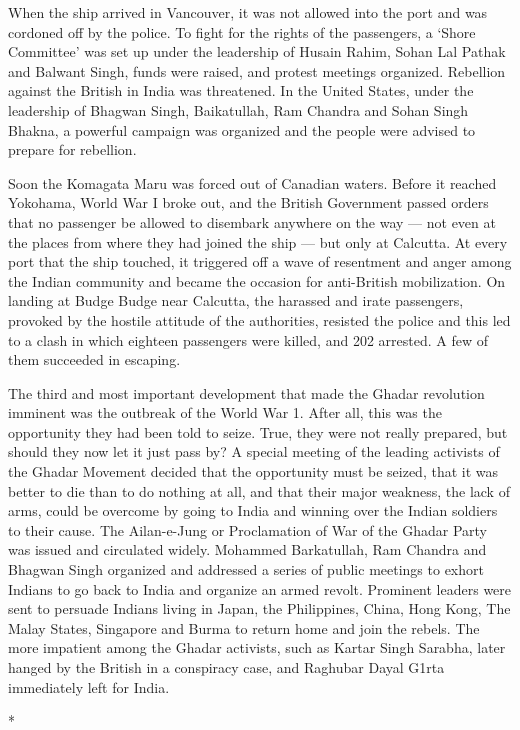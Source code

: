 When the ship arrived in Vancouver, it was not allowed into the port and was cordoned off by the police. To fight for the rights of the passengers, a `Shore Committee' was set up under the leadership of Husain Rahim, Sohan Lal Pathak and Balwant Singh, funds were raised, and protest meetings organized. Rebellion against the British in India was threatened. In the United States, under the leadership of Bhagwan Singh, Baikatullah, Ram Chandra and Sohan Singh Bhakna, a powerful campaign was organized and the people were advised to prepare for rebellion.

Soon the Komagata Maru was forced out of Canadian waters. Before it reached Yokohama, World War I broke out, and the British Government passed orders that no passenger be allowed to disembark anywhere on the way — not even at the places from where they had joined the ship — but only at Calcutta. At every port that the ship touched, it triggered off a wave of resentment and anger among the Indian community and became the occasion for anti-British mobilization. On landing at Budge Budge near Calcutta, the harassed and irate passengers, provoked by the hostile attitude of the authorities, resisted the police and this led to a clash in which eighteen passengers were killed, and 202 arrested. A few of them succeeded in escaping.

The third and most important development that made the Ghadar revolution imminent was the outbreak of the World War 1. After all, this was the opportunity they had been told to seize. True, they were not really prepared, but should they now let it just pass by? A special meeting of the leading activists of the Ghadar Movement decided that the opportunity must be seized, that it was better to die than to do nothing at all, and that their major weakness, the lack of arms, could be overcome by going to India and winning over the Indian soldiers to their cause. The Ailan-e-Jung or Proclamation of War of the Ghadar Party was issued and circulated widely. Mohammed Barkatullah, Ram Chandra and Bhagwan Singh organized and addressed a series of public meetings to exhort Indians to go back to India and organize an armed revolt. Prominent leaders were sent to persuade Indians living in Japan, the Philippines, China, Hong Kong, The Malay States, Singapore and Burma to return home and join the rebels. The more impatient among the Ghadar activists, such as Kartar Singh Sarabha, later hanged by the British in a conspiracy case, and Raghubar Dayal G1rta immediately left for India.

\begin{center}*\end{center}

